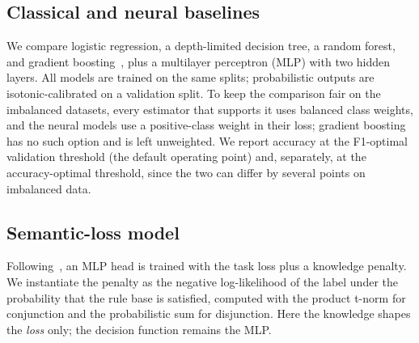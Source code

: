 \documentclass[11pt]{article}
\begin{document}
\subsection{Classical and neural baselines}
We compare logistic regression, a depth-limited decision tree, a random forest,
and gradient boosting~\cite{chen2016xgboost}, plus a multilayer perceptron (MLP)
with two hidden layers. All models are trained on the same splits; probabilistic
outputs are isotonic-calibrated on a validation split. To keep the comparison
fair on the imbalanced datasets, every estimator that supports it uses balanced
class weights, and the neural models use a positive-class weight in their loss;
gradient boosting has no such option and is left unweighted. We report accuracy at
the F1-optimal validation threshold (the default operating point) and, separately,
at the accuracy-optimal threshold, since the two can differ by several points on
imbalanced data.

\subsection{Semantic-loss model}
Following~\cite{xu2018semantic}, an MLP head is trained with the task loss plus a
knowledge penalty. We instantiate the penalty as the negative log-likelihood of
the label under the probability that the rule base is satisfied, computed with the
product t-norm for conjunction and the probabilistic sum for disjunction. Here the
knowledge shapes the \emph{loss} only; the decision function remains the MLP.
\end{document}
